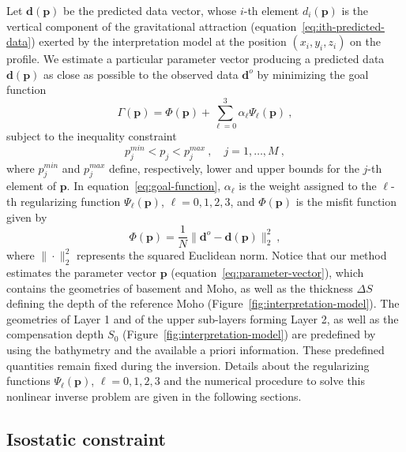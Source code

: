 \documentclass[manuscript]{geophysics}
\begin{document}
Let $\mathbf{d}(\mathbf{p})$ be the predicted data vector, whose $i$-th element
$d_{i}(\mathbf{p})$ is the vertical component of the gravitational attraction
(equation~\ref{eq:ith-predicted-data}) exerted by the interpretation model
at the position $(x_{i}, y_{i}, z_{i})$ on the profile.
We estimate a particular parameter vector producing a predicted data
$\mathbf{d}(\mathbf{p})$ as close as possible to the observed data 
$\mathbf{d}^{o}$ by minimizing the goal function
\begin{equation}
\Gamma (\mathbf{p}) = \Phi(\mathbf{p}) + \sum_{\ell = 0}^{3} \alpha_{\ell}
\Psi_{\ell}(\mathbf{p}) \: ,
\label{eq:goal-function}
\end{equation}
subject to the inequality constraint 
\begin{equation}
p_{j}^{min} < p_{j} < p_{j}^{max} \: , \quad j = 1, \dots, M \: ,
\label{eq:inequality-constraint}
\end{equation}
where $p_{j}^{min}$ and $p_{j}^{max}$ define, respectively, lower and upper bounds 
for the $j$-th element of $\mathbf{p}$.
In equation~\ref{eq:goal-function}, $\alpha_{\ell}$ is the weight assigned to the 
$\ell$-th regularizing function $\Psi_{\ell}(\mathbf{p})$, $\ell = 0, 1, 2, 3$, and
$\Phi(\mathbf{p})$ is the misfit function given by
\begin{equation}
\Phi(\mathbf{p}) = \frac{1}{N} \| \mathbf{d}^{o} - \mathbf{d}(\mathbf{p}) \|_{2}^{2} 
\: , 
\label{eq:misfit-function}
\end{equation}
where $\| \cdot \|_{2}^{2}$ represents the squared Euclidean norm. 
Notice that our method estimates the parameter vector $\mathbf{p}$ 
(equation~\ref{eq:parameter-vector}), which contains the geometries of 
basement and Moho, as well as the thickness $\Delta S$ defining
the depth of the reference Moho (Figure~\ref{fig:interpretation-model}).
The geometries of Layer 1 and of the upper sub-layers forming Layer 2, as well as the 
compensation depth $S_{0}$ (Figure~\ref{fig:interpretation-model}) are predefined by 
using the bathymetry and the available a priori information. 
These predefined quantities remain fixed during the inversion.
Details about the regularizing functions $\Psi_{\ell}(\mathbf{p})$, $\ell = 0, 1, 2, 3$ 
and the numerical procedure to solve this nonlinear inverse problem are given in the 
following sections.


\subsection{Isostatic constraint}
\end{document}
